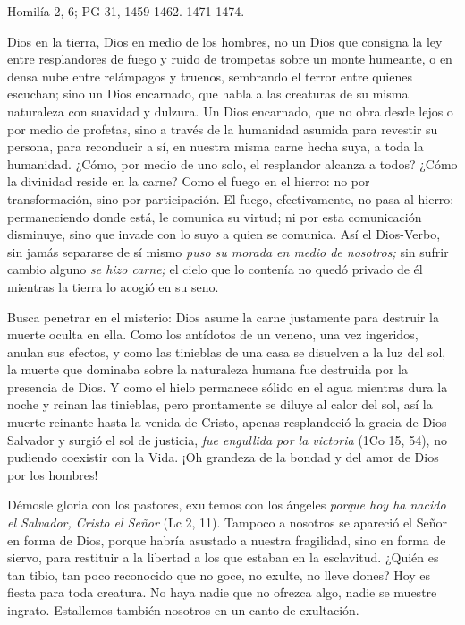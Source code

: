 \documentclass[]{article}
\begin{document}
Homilía 2, 6; PG 31, 1459-1462. 1471-1474.

Dios en la tierra, Dios en medio de los hombres, no un Dios que consigna
la ley entre resplandores de fuego y ruido de trompetas sobre un monte
humeante, o en densa nube entre relámpagos y truenos, sembrando el
terror entre quienes escuchan; sino un Dios encarnado, que habla a las
creaturas de su misma naturaleza con suavidad y dulzura. Un Dios
encarnado, que no obra desde lejos o por medio de profetas, sino a
través de la humanidad asumida para revestir su persona, para reconducir
a sí, en nuestra misma carne hecha suya, a toda la humanidad. ¿Cómo, por
medio de uno solo, el resplandor alcanza a todos? ¿Cómo la divinidad
reside en la carne? Como el fuego en el hierro: no por transformación,
sino por participación. El fuego, efectivamente, no pasa al hierro:
permaneciendo donde está, le comunica su virtud; ni por esta
comunicación disminuye, sino que invade con lo suyo a quien se comunica.
Así el Dios-Verbo, sin jamás separarse de sí mismo \emph{puso su morada
en medio de nosotros;} sin sufrir cambio alguno \emph{se hizo carne;} el
cielo que lo contenía no quedó privado de él mientras la tierra lo
acogió en su seno.

Busca penetrar en el misterio: Dios asume la carne justamente para
destruir la muerte oculta en ella. Como los antídotos de un veneno, una
vez ingeridos, anulan sus efectos, y como las tinieblas de una casa se
disuelven a la luz del sol, la muerte que dominaba sobre la naturaleza
humana fue destruida por la presencia de Dios. Y como el hielo permanece
sólido en el agua mientras dura la noche y reinan las tinieblas, pero
prontamente se diluye al calor del sol, así la muerte reinante hasta la
venida de Cristo, apenas resplandeció la gracia de Dios Salvador y
surgió el sol de justicia, \emph{fue engullida por la victoria} (1Co 15,
54), no pudiendo coexistir con la Vida. ¡Oh grandeza de la bondad y del
amor de Dios por los hombres!

Démosle gloria con los pastores, exultemos con los ángeles \emph{porque
hoy ha nacido el Salvador, Cristo el Señor} (Lc 2, 11). Tampoco a
nosotros se apareció el Señor en forma de Dios, porque habría asustado a
nuestra fragilidad, sino en forma de siervo, para restituir a la
libertad a los que estaban en la esclavitud. ¿Quién es tan tibio, tan
poco reconocido que no goce, no exulte, no lleve dones? Hoy es fiesta
para toda creatura. No haya nadie que no ofrezca algo, nadie se muestre
ingrato. Estallemos también nosotros en un canto de
exultación.\protect\hypertarget{_Ref448165076}{}{\protect\hypertarget{_Toc448662802}{}{\protect\hypertarget{_Toc448690321}{}{\protect\hypertarget{_Toc448708344}{}{\protect\hypertarget{_Toc448709430}{}{\protect\hypertarget{_Toc449554432}{}{}}}}}}
\end{document}
